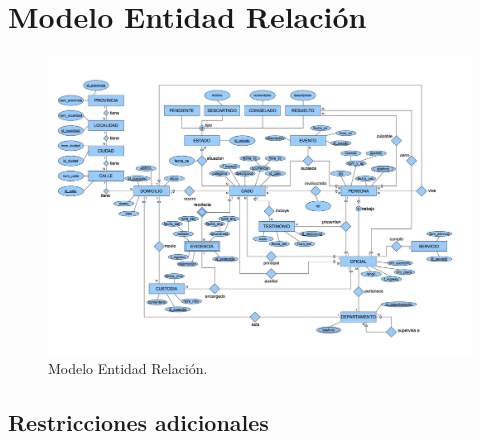 \section{Modelo Entidad Relación}

\begin{figure}[H]
  \includegraphics[angle=90, width=\linewidth]{figuras/DER.jpg}
  \caption{Modelo Entidad Relación.}
  \label{fig:MER}
\end{figure}

\subsection{Restricciones adicionales}

